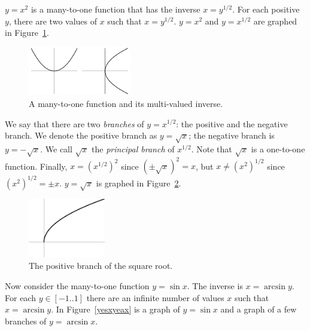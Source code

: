 \begin{Example}
$y=x^2$ is a many-to-one function that has the inverse $x=y^{1/2}$.  For each 
positive $y$, there are two values of $x$ such that $x=y^{1/2}$.
$y = x^2$ and $y = x^{1/2}$ are graphed in Figure~\ref{yexsyesx}.
\begin{figure}[h!]
\begin{center}
\includegraphics[width=0.4\textwidth]{algebra/sets/yexsyesx}
\end{center}
\caption{A many-to-one function and its multi-valued inverse.}
\label{yexsyesx}
\end{figure}
\end{Example}






We say that there are two \textit{branches}
of $y=x^{1/2}$: the positive and the negative branch.  We denote the positive
branch as $y=\sqrt{x}$; the negative branch is $y=-\sqrt{x}$.  We call
$\sqrt{x}$ the \textit{principal branch}
of $x^{1/2}$.  Note that $\sqrt{x}$ is a one-to-one function.
Finally, $x=(x^{1/2})^2$ since $(\pm \sqrt{x})^2  =x$, but
$x \neq (x^2)^{1/2}$ since $(x^2)^{1/2} = \pm x$.
$y = \sqrt{x}$ is graphed in Figure~\ref{yesqrtx}.

\begin{figure}[h!]
\begin{center}
\includegraphics[width=0.3\textwidth]{algebra/sets/yesqrtx}
\end{center}
\caption{The positive branch of the square root.}
\label{yesqrtx}
\end{figure}



Now consider the many-to-one function $y=\sin x$.  The inverse is 
$x=\arcsin y$.  For each $y \in [-1..1]$ there are an infinite number
of values $x$ such that $x = \arcsin y$.
In Figure~\ref{yesxyeax} is a graph of $y = \sin x$ and a graph of a few 
branches of $y = \arcsin x$.

